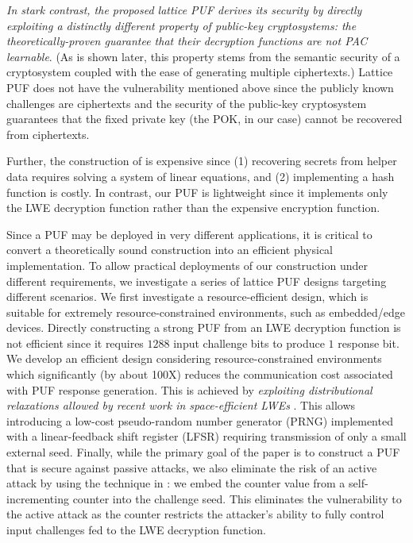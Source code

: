 \emph{In stark contrast, the proposed lattice PUF derives its security by directly exploiting a distinctly different property of public-key cryptosystems: the theoretically-proven guarantee that their decryption functions are not PAC learnable}. 
(As is shown later, this property stems from the semantic security of a cryptosystem coupled with the ease of generating multiple ciphertexts.) 
Lattice PUF does not have the vulnerability mentioned above since the publicly known challenges are ciphertexts and the security of the public-key cryptosystem guarantees that the fixed private key (the POK, in our case) cannot be recovered from ciphertexts.

Further, the construction of  \cite{herder2017trapdoor,jin2017fpga} is expensive since (1) recovering secrets from helper data requires solving a system of linear equations, and (2) implementing a hash function is costly.  
In contrast, our PUF is lightweight since it implements only the LWE decryption function rather than the expensive encryption function.

Since a PUF may be deployed in very different applications, it is critical to convert a theoretically sound construction into an efficient physical implementation. 
To allow practical deployments of our construction under different requirements, we investigate a series of lattice PUF designs targeting different scenarios. 
We first investigate a resource-efficient design, which is suitable for extremely resource-constrained environments, such as embedded/edge devices. 
Directly constructing a strong PUF from an LWE decryption function is not efficient since it requires $1288$ input challenge bits to produce $1$ response bit.
We develop an efficient design considering resource-constrained environments which significantly (by about 100X) reduces the communication cost associated with PUF response generation.
This is achieved by \emph{exploiting distributional relaxations allowed by recent work in space-efficient LWEs} \cite{galbraith2013space}.
This allows introducing a low-cost pseudo-random number generator (PRNG) implemented with a linear-feedback shift register (LFSR) requiring transmission of only a small external seed. 
Finally, while the primary goal of the paper is to construct a PUF that is secure against passive attacks, we also eliminate the risk of an active attack by using the technique in \cite{yu2016lockdown}: we embed the counter value from a self-incrementing counter into the challenge seed.
This eliminates the vulnerability to the active attack as the counter restricts the attacker's ability to fully control input challenges fed to the LWE decryption function.

